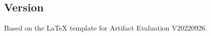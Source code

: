 \documentclass[nonacm,sigconf]{acmart}
\begin{document}






\subsection{Version}
Based on the LaTeX template for Artifact Evaluation V20220926.





\end{document}
